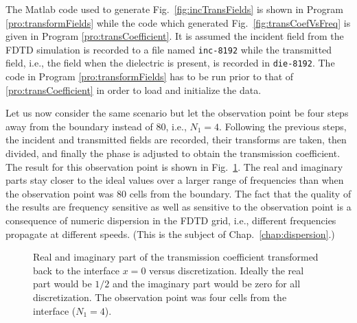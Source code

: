 The Matlab code used to generate Fig.\ \ref{fig:incTransFields} is
shown in Program \ref{pro:transformFields} while the code which
generated Fig.\ \ref{fig:transCoefVsFreq} is given in Program
\ref{pro:transCoefficient}.  It is assumed the incident field from the
FDTD simulation is recorded to a file named {\tt inc-8192} while the
transmitted field, i.e., the field when the dielectric is present, is
recorded in {\tt die-8192}.  The code in Program
\ref{pro:transformFields} has to be run prior to that of 
\ref{pro:transCoefficient} in order to load and initialize the data.

Let us now consider the same scenario but let the observation point be
four steps away from the boundary instead of $80$, i.e., $N_1=4$.
Following the previous steps, the incident and transmitted fields are
recorded, their transforms are taken, then divided, and finally the
phase is adjusted to obtain the transmission coefficient.  The result
for this observation point is shown in Fig.\
\ref{fig:transCoefVsFreqX4}.  The real and imaginary parts stay closer
to the ideal values over a larger range of frequencies than when the
observation point was $80$ cells from the boundary.  The fact that the
quality of the results are frequency sensitive as well as sensitive to
the observation point is a consequence of numeric dispersion in the
FDTD grid, i.e., different frequencies propagate at different speeds.
(This is the subject of Chap.\ \ref{chap:dispersion}.)
\begin{figure}
  \begin{center}
  \end{center}

  \caption{Real and imaginary part of the transmission coefficient
    transformed back to the interface $x=0$ versus discretization.
    Ideally the real part would be $1/2$ and the imaginary part would
    be zero for all discretization.  The observation point was four
    cells from the interface ($N_1 = 4$).}
   \label{fig:transCoefVsFreqX4}
\end{figure}

